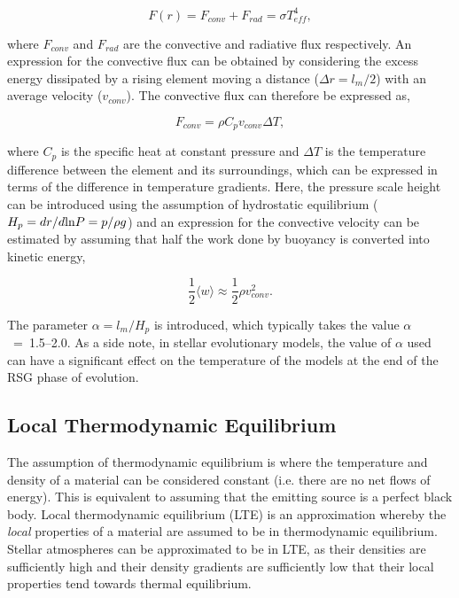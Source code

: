 \begin{equation}
    F(r) = F_{conv} + F_{rad} = \sigma T_{eff}^4,\label{eq:flux}
\end{equation}

where $F_{conv}$ and $F_{rad}$ are the convective and radiative flux respectively.
An expression for the convective flux can be obtained by considering the excess energy dissipated by a rising element moving a distance
($\Delta r = l_m/2$) with an average velocity ($v_{conv}$).
The convective flux can therefore be expressed as,

\begin{equation}
    F_{conv} = \rho C_pv_{conv}\Delta T,
\end{equation}

where $C_p$ is the specific heat at constant pressure and $\Delta T$ is the temperature difference between the element and its surroundings, which can be expressed in terms of the difference in temperature gradients.
Here, the pressure scale height can be introduced using the assumption of hydrostatic equilibrium ($H_p = dr / d{\rm ln} P = p/\rho g$) and an expression for the convective velocity can be estimated by assuming that half the work done by buoyancy is converted into kinetic energy,

\begin{equation}
    \frac{1}{2}\langle w\rangle \approx \frac{1}{2}\rho v_{conv}^2.
\end{equation}

The parameter $\alpha = l_m/H_p$ is introduced, which typically takes the value $\alpha$~=~1.5--2.0.
As a side note, in stellar evolutionary models, the value of $\alpha$ used can have a significant effect on the temperature of the models at the end of the RSG phase of evolution.



\subsection{Local Thermodynamic Equilibrium} %
\label{sub:local_thermodynamic_equilibrium}

The assumption of thermodynamic equilibrium is where the temperature and density of a material can be considered constant (i.e. there are no net flows of energy).
This is equivalent to assuming that the emitting source is a perfect black body.
Local thermodynamic equilibrium (LTE) is an approximation whereby the {\it local} properties of a material are assumed to be in thermodynamic equilibrium.
Stellar atmospheres can be approximated to be in LTE, as their densities are sufficiently high and their density gradients are sufficiently low that their local properties tend towards thermal equilibrium.

